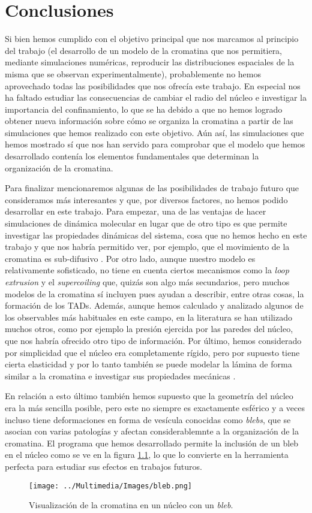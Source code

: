 \chapter{Conclusiones}
\label{cap:conclusions}

Si bien hemos cumplido con el objetivo principal que nos marcamos al principio del trabajo (el desarrollo de un modelo de la cromatina que nos permitiera, mediante simulaciones numéricas, reproducir las distribuciones espaciales de la misma que se observan experimentalmente), probablemente no hemos aprovechado todas las posibilidades que nos ofrecía este trabajo. En especial nos ha faltado estudiar las consecuencias de cambiar el radio del núcleo e investigar la importancia del confinamiento, lo que se ha debido a que no hemos logrado obtener nueva información sobre cómo se organiza la cromatina a partir de las simulaciones que hemos realizado con este objetivo. Aún así, las simulaciones que hemos mostrado sí que nos han servido para comprobar que el modelo que hemos desarrollado contenía los elementos fundamentales que determinan la organización de la cromatina.

Para finalizar mencionaremos algunas de las posibilidades de trabajo futuro que consideramos más interesantes y que, por diversos factores, no hemos podido desarrollar en este trabajo. Para empezar, una de las ventajas de hacer simulaciones de dinámica molecular en lugar que de otro tipo es que permite investigar las propiedades dinámicas del sistema, cosa que no hemos hecho en este trabajo y que nos habría permitido ver, por ejemplo, que el movimiento de la cromatina es sub-difusivo \cite{Shi2018}. Por otro lado, aunque nuestro modelo es relativamente sofisticado, no tiene en cuenta ciertos mecanismos como la \textit{loop extrusion} y el \textit{supercoiling} que, quizás son algo más secundarios, pero muchos modelos de la cromatina sí incluyen pues ayudan a describir, entre otras cosas, la formación de los TADs. Además, aunque hemos calculado y analizado algunos de los observables más habituales en este campo, en la literatura se han utilizado muchos otros, como por ejemplo la presión ejercida por las paredes del núcleo, que nos habría ofrecido otro tipo de información. Por último, hemos considerado por simplicidad que el núcleo era completamente rígido, pero por supuesto tiene cierta elasticidad y por lo tanto también se puede modelar la lámina de forma similar a la cromatina e investigar sus propiedades mecánicas \cite{Attar2024}.

En relación a esto último también hemos supuesto que la geometría del núcleo era la más sencilla posible, pero este no siempre es exactamente esférico y a veces incluso tiene deformaciones en forma de vesícula conocidas como \textit{blebs}, que se asocian con varias patologías y afectan considerablemnte a la organización de la cromatina. El programa que hemos desarrollado permite la inclusión de un bleb en el núcleo como se ve en la figura \ref{fig:bleb}, lo que lo convierte en la herramienta perfecta para estudiar sus efectos en trabajos futuros.

\begin{figure}[t]
    \centering
    \texttt{[image: ../Multimedia/Images/bleb.png]}
    \caption{Visualización de la cromatina en un núcleo con un \textit{bleb}.}
    \label{fig:bleb}
\end{figure}
